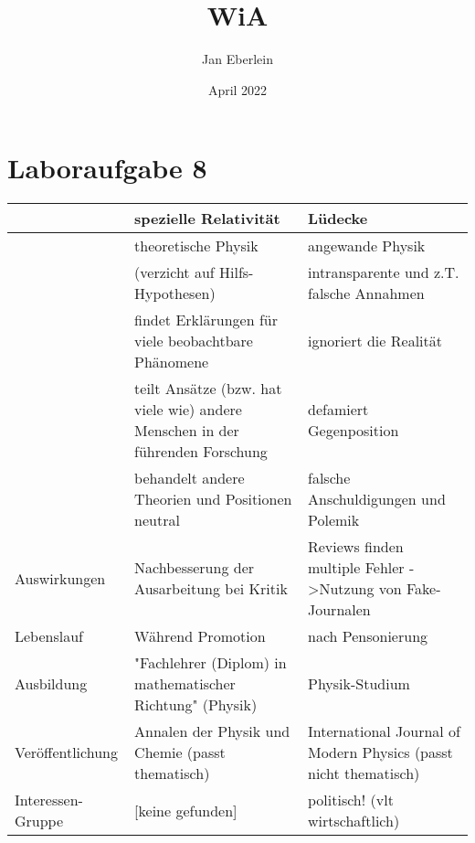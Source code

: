 \documentclass{article}
\title{WiA}
\author{Jan Eberlein}
\date{April 2022}
\begin{document}
\maketitle

\section{Laboraufgabe 8}

\renewcommand*{\arraystretch}{1.5}
\begin{longtable}{@{}|p{}|p{}p{}|@{}}
    \hline
                      & spezielle Relativität                                                         & Lüdecke                                                          \\ \hline
    \endfirsthead
    \endhead
    \hline
    \endfoot
    \endlastfoot
                      & theoretische Physik                                                           & angewande Physik                                                 \\
                      & (verzicht auf Hilfs-Hypothesen)                                               & intransparente und z.T. falsche Annahmen                         \\
                      & findet Erklärungen für viele beobachtbare Phänomene                           & ignoriert die Realität                                           \\
                      & teilt Ansätze (bzw. hat viele wie) andere Menschen in der führenden Forschung & defamiert Gegenposition                                          \\
                      & behandelt andere Theorien und Positionen neutral                              & falsche Anschuldigungen und Polemik                              \\
    Auswirkungen      & Nachbesserung der Ausarbeitung bei Kritik                                     & Reviews finden multiple Fehler -\textgreater Nutzung von Fake-Journalen      \\
    Lebenslauf        & Während Promotion                                                             & nach Pensonierung                                                \\
    Ausbildung        & "Fachlehrer (Diplom) in mathematischer Richtung" (Physik)                     & Physik-Studium                                                   \\
    Veröffentlichung  & Annalen der Physik und Chemie (passt thematisch)                              & International Journal of Modern Physics (passt nicht thematisch) \\
    Interessen-Gruppe & {[}keine gefunden{]}                                                          & politisch! (vlt wirtschaftlich)                                  \\ \hline
    \end{longtable}
\end{document}
